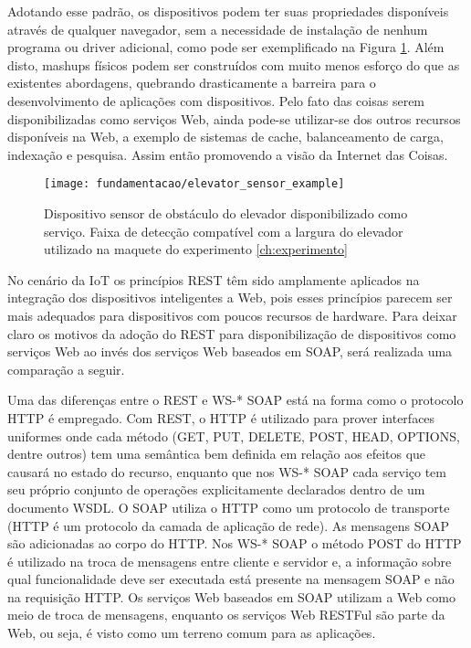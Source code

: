 Adotando esse padrão, os dispositivos podem ter suas propriedades disponíveis através de qualquer navegador, sem a necessidade de instalação de nenhum programa ou driver adicional, como pode ser exemplificado na Figura \ref{fig:dispnavegador}. Além disto, mashups físicos\footnotemark {} podem ser construídos com muito menos esforço do que as existentes abordagens, quebrando drasticamente a barreira para o desenvolvimento de aplicações com dispositivos\cite{Guinard:2009}. Pelo fato das coisas serem disponibilizadas como serviços Web, ainda pode-se utilizar-se dos outros recursos disponíveis na Web, a exemplo de sistemas de cache, balanceamento de carga, indexação e pesquisa\cite{Franca:2011}. Assim então promovendo a visão da Internet das Coisas.

\begin{figure}[!htb] \centering 
  \centering
  \texttt{[image: fundamentacao/elevator\_sensor\_example]} 
  \caption{Dispositivo sensor de obstáculo do elevador disponibilizado como serviço. Faixa de detecção compatível com a largura do elevador utilizado na maquete do experimento    \ref{ch:experimento}} 
  \label{fig:dispnavegador}
\end{figure}

No cenário da IoT os princípios REST têm sido amplamente aplicados na integração dos dispositivos inteligentes a Web, pois esses princípios parecem ser mais adequados para dispositivos com poucos recursos de hardware\cite{Franca:2011}. Para deixar claro os motivos da adoção do REST para disponibilização de dispositivos como serviços Web ao invés dos serviços Web baseados em SOAP, será realizada uma comparação a seguir.

Uma das diferenças entre o REST e WS-* SOAP está na forma como o protocolo HTTP é empregado. Com REST, o HTTP é utilizado para prover interfaces uniformes onde cada método (GET, PUT, DELETE, POST, HEAD, OPTIONS, dentre outros) tem uma semântica bem definida em relação aos efeitos que causará no estado do recurso\cite{Franca:2011}, enquanto que nos WS-* SOAP cada serviço tem seu próprio conjunto de operações explicitamente declarados dentro de um documento WSDL\cite{Pautasso:2014}. O SOAP utiliza o HTTP como um protocolo de transporte (HTTP é um protocolo da camada de aplicação de rede). As mensagens SOAP são adicionadas ao corpo do HTTP. Nos WS-* SOAP o método POST do HTTP é utilizado na troca de mensagens entre cliente e servidor e, a informação sobre qual funcionalidade deve ser executada está presente na mensagem SOAP e não na requisição HTTP. Os serviços Web baseados em SOAP utilizam a Web como meio de troca de mensagens, enquanto os serviços Web RESTFul são parte da Web, ou seja, é visto como um terreno comum para as aplicações\cite{Franca:2011}.

